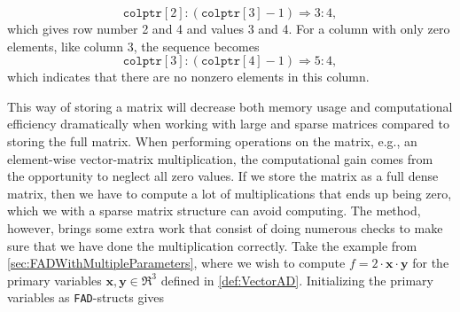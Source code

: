 \begin{equation*}
    \texttt{colptr}[2]:(\texttt{colptr}[3]-1) \Longrightarrow 3:4,
\end{equation*}
which gives row number 2 and 4 and values 3 and 4. For a column with only zero elements, like column 3, the sequence becomes
\begin{equation*}
    \texttt{colptr}[3]:(\texttt{colptr}[4]-1)\Longrightarrow 5:4,
\end{equation*}
which indicates that there are no nonzero elements in this column. 

This way of storing a matrix will decrease both memory usage and computational efficiency dramatically when working with large and sparse matrices compared to storing the full matrix. When performing operations on the matrix, e.g., an element-wise vector-matrix  multiplication, the computational gain comes from the opportunity to neglect all zero values. If we store the matrix as a full dense matrix, then we have to compute a lot of multiplications that ends up being zero, which we with a sparse matrix structure can avoid computing. The method, however, brings some extra work that consist of doing numerous checks to make sure that we have done the multiplication correctly. Take the example from \autoref{sec:FADWithMultipleParameters}, where we wish to compute $f = 2\cdot \textbf{x}\cdot \textbf{y}$ for the primary variables $\textbf{x},\textbf{y}\in \Re^3$ defined in \eqref{def:VectorAD}. Initializing the primary variables as \texttt{FAD}-structs gives 
